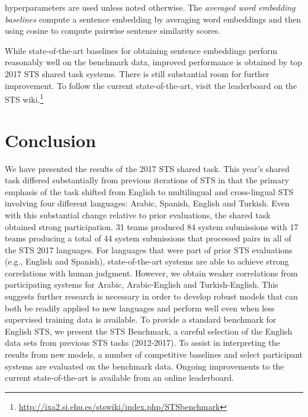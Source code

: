 \documentclass[11pt,a4paper]{article}
\begin{document}
hyperparameters are used unless noted otherwise. The {\it averaged word embedding baselines} compute a sentence embedding by averaging word embeddings and then using cosine to compute pairwise sentence similarity scores.

While state-of-the-art baselines for obtaining sentence embeddings perform reasonably well on the benchmark data, improved performance is obtained by top 2017 STS shared task systems. There is still substantial room for further improvement. To follow the current state-of-the-art, visit the leaderboard on the STS wiki.\footnote{\url{http://ixa2.si.ehu.es/stswiki/index.php/STSbenchmark}}

\section{Conclusion}

We have presented the results of the 2017 STS shared task. This year's shared task differed substantially from previous iterations of STS in that the primary emphasis of the task shifted from English to multilingual and cross-lingual STS involving four different languages: Arabic, Spanish, English and Turkish. Even with this substantial change relative to prior evaluations, the shared task obtained strong participation. 31 teams produced 84 system submissions with 17 teams producing a total of 44 system submissions that processed pairs in all of the STS 2017 languages. For languages that were part of prior STS evaluations (e.g., English and Spanish), state-of-the-art systems are able to achieve strong correlations with human judgment. However, we obtain weaker correlations from participating systems for Arabic, Arabic-English and Turkish-English. This suggests further research is necessary in order to develop robust models that can both be readily applied to new languages and perform well even when less supervised training data is available. To provide a standard benchmark for English STS, we present the STS Benchmark, a careful selection of the English data sets from previous STS tasks (2012-2017). To assist in interpreting the results from new models, a number of competitive baselines and select participant systems are evaluated on the benchmark data. Ongoing improvements to the current state-of-the-art is available from an online leaderboard. 
 
\end{document}
